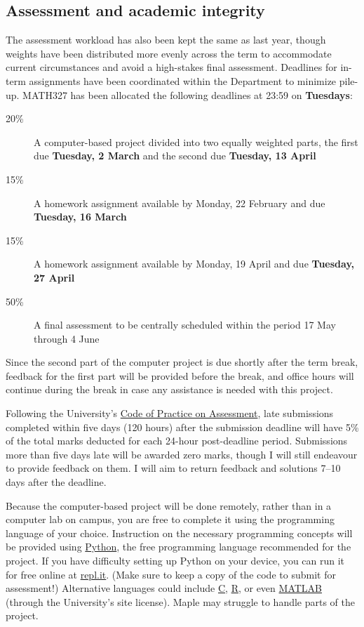 \subsection*{Assessment and academic integrity}
The assessment workload has also been kept the same as last year, though weights have been distributed more evenly across the term to accommodate current circumstances and avoid a high-stakes final assessment.
Deadlines for in-term assignments have been coordinated within the Department to minimize pile-up.
MATH327 has been allocated the following deadlines at 23:59 on \textbf{Tuesdays}:
\begin{description}
  \item[20\%] A computer-based project divided into two equally weighted parts, the first due \textbf{Tuesday, 2 March} and the second due \textbf{Tuesday, 13 April}
  \item[15\%] A homework assignment available by Monday, 22 February and due \textbf{Tuesday, 16 March}
  \item[15\%] A homework assignment available by Monday, 19 April and due \textbf{Tuesday, 27 April}
  \item[50\%] A final assessment to be centrally scheduled within the period 17 May through 4 June
\end{description}
Since the second part of the computer project is due shortly after the term break, feedback for the first part will be provided before the break, and office hours will continue during the break in case any assistance is needed with this project.

Following the University's \href{https://www.liverpool.ac.uk/media/livacuk/tqsd/code-of-practice-on-assessment/code_of_practice_on_assessment.pdf}{Code of Practice on Assessment}, late submissions completed within five days (120 hours) after the submission deadline will have 5\% of the total marks deducted for each 24-hour post-deadline period.
Submissions more than five days late will be awarded zero marks, though I will still endeavour to provide feedback on them.
I will aim to return feedback and solutions 7--10 days after the deadline.

Because the computer-based project will be done remotely, rather than in a computer lab on campus, you are free to complete it using the programming language of your choice.
Instruction on the necessary programming concepts will be provided using \href{https://www.python.org}{Python}, the free programming language recommended for the project.
If you have difficulty setting up Python on your device, you can run it for free online at \href{https://repl.it/languages/python3}{repl.it}. %
(Make sure to keep a copy of the code to submit for assessment!)
Alternative languages could include \href{https://en.wikipedia.org/wiki/C_(programming_language)}{C}, \href{https://www.r-project.org}{R}, or even \href{https://matlab.mathworks.com}{MATLAB} (through the University's site license).
Maple may struggle to handle parts of the project.


